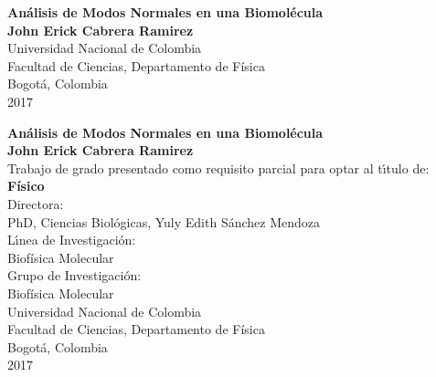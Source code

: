 \begin{center}
\begin{figure}
\centering%
%
\end{figure}
\thispagestyle{empty} \vspace*{2.0cm} \textbf{\huge
An\'{a}lisis de Modos Normales \vspace{1cm}
en una Biomol\'{e}cula}\\[5.0cm]
\Large\textbf{John Erick Cabrera Ramirez}\\[6.0cm]
\small Universidad Nacional de Colombia\\
Facultad de Ciencias, Departamento de F\'{i}sica\\
Bogot\'{a}, Colombia\\
2017\\
\end{center}


\newpage
\begin{center}
\thispagestyle{empty} \vspace*{-0.5cm} \textbf{\huge An\'{a}lisis de Modos Normales \vspace{0.2cm} en una Biomol\'{e}cula}\\[3.0cm]
\Large\textbf{John Erick Cabrera Ramirez}\\[3.0cm]
\small Trabajo de grado presentado como requisito parcial para optar al t\'{\i}tulo de:\\
\textbf{F\'{i}sico}\\[2.5cm]
Directora:\\
PhD, Ciencias Biol\'{o}gicas, Yuly Edith S\'{a}nchez Mendoza \\[2.0cm]
L\'{\i}nea de Investigaci\'{o}n:\\
Biof\'{i}sica Molecular\\
Grupo de Investigaci\'{o}n:\\
Biof\'{i}sica Molecular\\[2.5cm]
Universidad Nacional de Colombia\\
Facultad de Ciencias, Departamento de F\'{i}sica\\
Bogot\'{a}, Colombia\\
2017\\
\end{center}

